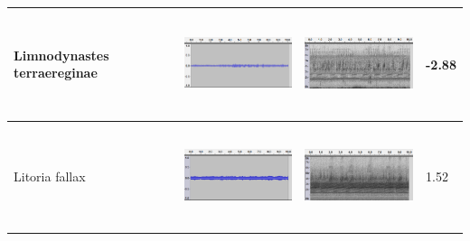 \begin{table}[htb!]
{\begin{tabular}{llll}
Limnodynastes terraereginae &  \begin{minipage}{.3\textwidth} \includegraphics[width=45mm, height=30mm]{image/Ch1/ter_jcu_wav.png}  \end{minipage}        &   \begin{minipage}{.3\textwidth} \includegraphics[width=45mm, height=30mm]{image/Ch1/ter_jcu_spec.png}  \end{minipage}          & -2.88    \\ \hline
Litoria fallax              &   \begin{minipage}{.3\textwidth} \includegraphics[width=45mm, height=30mm]{image/Ch1/fallax_jcu_wav.png}  \end{minipage}       &    \begin{minipage}{.3\textwidth} \includegraphics[width=45mm, height=30mm]{image/Ch1/fallax_jcu_spec.png}  \end{minipage}         & 1.52     \\ \hline

\end{tabular}}
\end{table}
